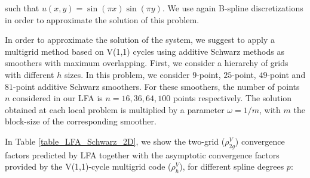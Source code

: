 \documentclass{article}
\begin{document}
\noindent such that $u(x,y)=\sin(\pi x) \sin(\pi y)$. We use again B-spline discretizations in order to approximate the solution of this problem. 

In order to approximate the solution of the system, we suggest to apply a multigrid method based on V(1,1) cycles using additive Schwarz methods as smoothers with maximum overlapping. First, we consider a hierarchy of grids with different $h$ sizes. In this problem, we consider $9$-point, $25$-point, $49$-point and $81$-point additive Schwarz smoothers. For these smoothers, the number of points $n$ considered in our LFA is $n=16,36,64,100$ points respectively. The solution obtained at each local problem is multiplied by a parameter $\omega=1/m$, with $m$ the block-size of the corresponding smoother.

In Table \ref{table_LFA_Schwarz_2D}, we show the two-grid ($\rho^V_{2g}$) convergence factors predicted by LFA together with the asymptotic convergence factors provided by the V(1,1)-cycle multigrid code ($\rho^V_h$), for different spline degrees $p$:
\end{document}
